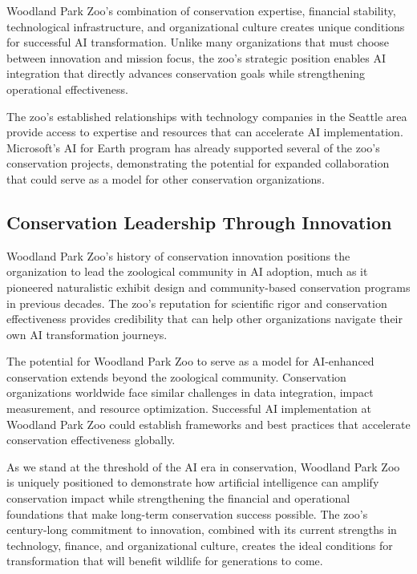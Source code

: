 \documentclass[
  Letterpaper,
]{scrbook}
\begin{document}
Woodland Park Zoo's combination of conservation expertise, financial
stability, technological infrastructure, and organizational culture
creates unique conditions for successful AI transformation. Unlike many
organizations that must choose between innovation and mission focus, the
zoo's strategic position enables AI integration that directly advances
conservation goals while strengthening operational effectiveness.

The zoo's established relationships with technology companies in the
Seattle area provide access to expertise and resources that can
accelerate AI implementation. Microsoft's AI for Earth program has
already supported several of the zoo's conservation projects,
demonstrating the potential for expanded collaboration that could serve
as a model for other conservation organizations.

\subsection{Conservation Leadership Through
Innovation}\label{conservation-leadership-through-innovation}

Woodland Park Zoo's history of conservation innovation positions the
organization to lead the zoological community in AI adoption, much as it
pioneered naturalistic exhibit design and community-based conservation
programs in previous decades. The zoo's reputation for scientific rigor
and conservation effectiveness provides credibility that can help other
organizations navigate their own AI transformation journeys.

The potential for Woodland Park Zoo to serve as a model for AI-enhanced
conservation extends beyond the zoological community. Conservation
organizations worldwide face similar challenges in data integration,
impact measurement, and resource optimization. Successful AI
implementation at Woodland Park Zoo could establish frameworks and best
practices that accelerate conservation effectiveness globally.

As we stand at the threshold of the AI era in conservation, Woodland
Park Zoo is uniquely positioned to demonstrate how artificial
intelligence can amplify conservation impact while strengthening the
financial and operational foundations that make long-term conservation
success possible. The zoo's century-long commitment to innovation,
combined with its current strengths in technology, finance, and
organizational culture, creates the ideal conditions for transformation
that will benefit wildlife for generations to come.
\end{document}
